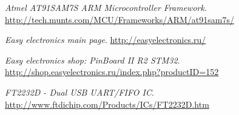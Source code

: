 \documentclass[11pt]{article}
\begin{document}
\begin{thebibliography}{9}
			\emph{Atmel AT91SAM7S ARM Microcontroller Framework}.
			\url{http://tech.munts.com/MCU/Frameworks/ARM/at91sam7s/}

			\emph{Easy electronics main page}.
			\url{http://easyelectronics.ru/}
			
			\emph{Easy electronics shop: PinBoard II R2 STM32}.
			\url{http://shop.easyelectronics.ru/index.php?productID=152}

			\emph{FT2232D - Dual USB UART/FIFO IC}.
			\url{http://www.ftdichip.com/Products/ICs/FT2232D.htm}


	\end{thebibliography}
\end{document}
